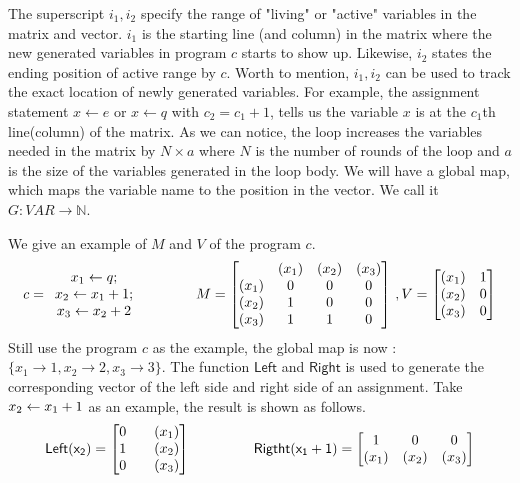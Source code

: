 \documentclass[a4paper,11pt]{article}
\begin{document}
The superscript $i_1,i_2$  specify the range of "living" or "active" variables in the matrix and vector. $i_1$ is the starting line (and column) in the matrix where the new generated variables in program $c$ starts to show up. Likewise, $i_2$ states the ending position of active range by $c$.
 Worth to mention, $i_1,i_2$ can be used to track the exact location of newly generated variables. For example, the assignment statement $x \leftarrow e$ or $x \leftarrow q $ with $c_2 =c_1+1$, tells us the variable $x$ is at the $c_1$th line(column) of the matrix. As we can notice, the loop increases the variables needed in the matrix by $N \times a$ where $N$ is the number of rounds of the loop and $a$ is the size of the variables generated in the loop body. We will have a global map, which maps the variable name to the position in the vector. We call it $G: VAR \to \mathbb{N}$.

We give an example of $M$ and $V$ of the program $c$.   
$$
c= \begin{array}{c}
\assign {x_1} {q} ;        \\
\assign {x_2} {x_1+1} ;\\
\assign {x_3} {x_2+2} 
\end{array}~~~~~~~~~~~~
M =  \left[ \begin{matrix}
 & (x_1) & (x_2) & (x_3) \\
(x_1) & 0 & 0 & 0 \\
(x_2) & 1 & 0 & 0 \\
(x_3) & 1 & 1 & 0 \\
\end{matrix} \right] ~ , V = \left [ \begin{matrix}
(x_1) &  1 \\
(x_2) & 0 \\
(x_3) & 0 \\
\end{matrix} \right ]
$$
Still use the program $c$ as the example, the global map is now : $ \{ x_1 \to 1, x_2 \to 2, x_3 \to 3 \} $. 
The function $\mathsf{Left}$ and $\mathsf{Right}$ is used to generate the corresponding vector of the left side and right side of an assignment. Take $\mathrel{ x_2 \leftarrow x_1+1 } $ as an example, the result is shown as follows.
\[
\sf{Left}(x_2) = \left[ \begin{matrix}
 0  & ~~~(x_1) \\
 1 & ~~~(x_2) \\
 0 & ~~~(x_3) \\
\end{matrix}   \right ] ~~~~~~~~~~~~~~
\sf{Rigtht} (x_1+1) = \left[ \begin{matrix} 
   1 & 0 & 0 \\
   (x_1) & (x_2) & (x_3) \\
\end{matrix}  \right]
\]
\end{document}
